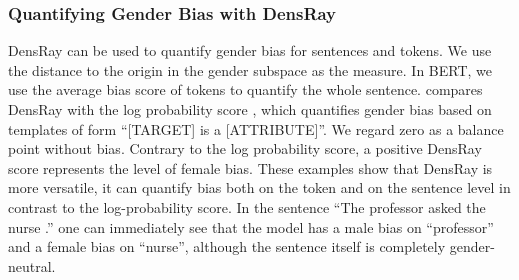 \subsubsection*{Quantifying Gender Bias with DensRay}
DensRay can be used to quantify gender bias for sentences
and tokens. We use the distance to the origin in the gender
subspace as the measure. In BERT, we use the average
bias score of tokens to quantify the whole
sentence.  compares DensRay with the log
probability score \cite{kurita2019measuring}, which
quantifies gender bias based on templates of form ``[TARGET]
is a [ATTRIBUTE]''. We regard zero as a balance point
without bias. Contrary to the log probability score, a
positive DensRay score represents the level of female
bias. These examples show that DensRay is more versatile, it
can quantify  bias both on the token and on the sentence level in contrast to the log-probability score.
In the sentence ``The professor asked the nurse .'' one can immediately see that the model has a male bias on ``professor'' and a female bias on ``nurse'', although the sentence itself
is completely gender-neutral.
